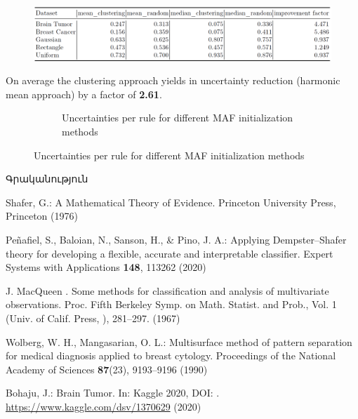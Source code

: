 \documentclass[aspectratio=169]{beamer}
\begin{document}
\begin{frame}
\begin{figure}
    \centering
    \includegraphics[width=1\linewidth]{score_df.png}
\end{figure}
On average the clustering approach yields in uncertainty
reduction (harmonic mean approach) by a factor of \textbf{2.61}.
\end{frame}

\begin{figure}
\begin{figure}
    \caption{Uncertainties per rule for different MAF initialization methods}
    \label{fig:bars}
\end{figure}
\end{figure}

\begin{frame}{Գրականություն}
    
\begin{thebibliography}{8}
{\rm
{}
Shafer, G.: A Mathematical Theory of Evidence. Princeton University Press, Princeton (1976)

Peñafiel, S., Baloian, N., Sanson, H., \& Pino, J. A.: Applying Dempster–Shafer theory for developing a flexible, accurate and interpretable classifier. Expert Systems with Applications \textbf{148}, 113262 (2020)

J. MacQueen . Some methods for classification and analysis of multivariate observations. Proc. Fifth Berkeley Symp. on Math. Statist. and Prob., Vol. 1 (Univ. of Calif. Press, ), 281--297. (1967)

Wolberg, W. H., Mangasarian, O. L.: Multisurface method of pattern separation for medical diagnosis applied to breast cytology. Proceedings of the National Academy of Sciences \textbf{87}(23), 9193--9196 (1990)

Bohaju, J.: Brain Tumor. In: Kaggle 2020, DOI: . \url{https://www.kaggle.com/dsv/1370629} (2020)
}
\end{thebibliography}
\end{frame}
\end{document}
